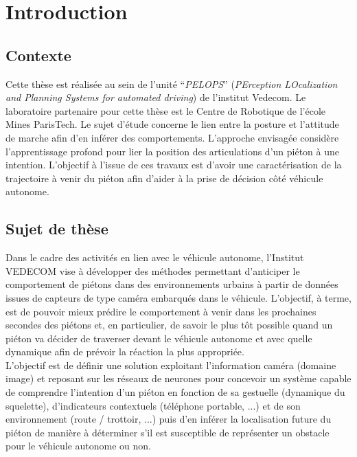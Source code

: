 \clearpage
\chapter{Introduction}
\label{sec:Intro}

\section{Contexte}
Cette thèse est réalisée au sein de l’unité “\textit{PELOPS}” (\textit{PErception LOcalization and Planning Systems for automated driving}) de l'institut Vedecom. Le laboratoire partenaire pour cette thèse est le Centre de Robotique de l'école Mines ParisTech. Le sujet d’étude concerne le lien entre la posture et l’attitude de marche afin d’en inférer des comportements. L’approche envisagée considère l’apprentissage profond pour lier la position des articulations d’un piéton à une intention. L’objectif à l’issue de ces travaux est d’avoir une caractérisation de la trajectoire à venir du piéton afin d’aider à la prise de décision côté véhicule autonome.

\section{Sujet de thèse}
Dans le cadre des activités en lien avec le véhicule autonome, l’Institut VEDECOM vise à développer des méthodes permettant d’anticiper le comportement de piétons dans des environnements urbains à partir de données issues de capteurs de type caméra embarqués dans le véhicule. L’objectif, à terme, est de pouvoir mieux prédire le comportement à venir dans les prochaines secondes des piétons et, en particulier, de savoir le plus tôt possible quand un piéton va décider de traverser devant le véhicule autonome et avec quelle dynamique afin de prévoir la réaction la plus appropriée.\\

L'objectif est de définir une solution exploitant l’information caméra (domaine image) et reposant sur les réseaux de neurones pour concevoir un système capable de comprendre l’intention d’un piéton en fonction de sa gestuelle (dynamique du squelette), d'indicateurs contextuels (téléphone portable, ...) et de son environnement (route / trottoir, ...) puis d’en inférer la localisation future du piéton de manière à déterminer s’il est susceptible de représenter un obstacle pour le véhicule autonome ou non.

